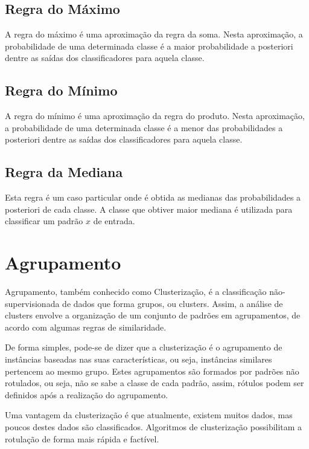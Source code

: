 \subsection{Regra do Máximo}
\label{subsubsec:regradomaximo}

A regra do máximo é uma aproximação da regra da soma. Nesta aproximação, a probabilidade de uma determinada classe é a maior probabilidade a posteriori dentre as saídas dos classificadores para aquela classe.

\subsection{Regra do Mínimo}
\label{subsubsec:regradominimo}

A regra do mínimo é uma aproximação da regra do produto. Nesta aproximação, a probabilidade de uma determinada classe é a menor das probabilidades a posteriori dentre as saídas dos classificadores para aquela classe.


\subsection{Regra da Mediana}
\label{subsubsec:regradamediana}

Esta regra é um caso particular onde é obtida as medianas das probabilidades a posteriori de cada classe. A classe que obtiver maior mediana é utilizada para classificar um padrão $x$ de entrada.

\section{Agrupamento}

Agrupamento, também conhecido como Clusterização, é a classificação não-supervisionada de dados que forma grupos, ou clusters. Assim, a análise de clusters envolve a organização de um conjunto de padrões em agrupamentos, de acordo com algumas regras de similaridade.

De forma simples, pode-se de dizer que a clusterização é o agrupamento de instâncias baseadas nas suas características, ou seja, instâncias similares pertencem ao mesmo grupo. Estes agrupamentos são formados por padrões não rotulados, ou seja, não se sabe a classe de cada padrão, assim, rótulos podem ser definidos após a realização do agrupamento.

Uma vantagem da clusterização é que atualmente, existem muitos dados, mas poucos destes dados são classificados. Algoritmos de clusterização possibilitam a rotulação de forma mais rápida e factível.

